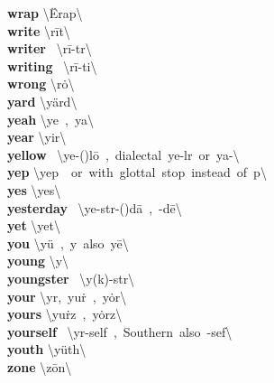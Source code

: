 \documentclass[10pt,a4paper]{article}
\begin{document}
\begin{multicols}{2}
\textbf{ wrap }\quad \textbackslash \"{E}\textsuperscript{\pwedge}rap\textbackslash \\
\textbf{ write }\quad \textbackslash \textprimstress r\={i}t\textbackslash \\
\textbf{ writer }\quad \ \textbackslash \textprimstress r\={i}-t\textschwa r\textbackslash \\
\textbf{ writing }\quad \ \textbackslash \textprimstress r\={i}-ti\engma \textbackslash \\
\textbf{ wrong }\quad \textbackslash \textprimstress r\.{o}\engma \textbackslash \\
\textbf{ yard }\quad \textbackslash \textprimstress y\"{a}rd\textbackslash \\
\textbf{ yeah }\quad \textbackslash \textprimstress ye\textschwa \ ,\ \textprimstress ya\textschwa \textbackslash \\
\textbf{ year }\quad \textbackslash \textprimstress yir\textbackslash \\
\textbf{ yellow }\quad \ \textbackslash \textprimstress ye-(\textsecstress )l\={o}\ ,\ dialectal\ \textprimstress ye-l\textschwa r\ or\ \textprimstress ya-\textbackslash \\
\textbf{ yep }\quad \textbackslash \textprimstress yep\ \ or\ with\ glottal\ stop\ instead\ of\ p\textbackslash \\
\textbf{ yes }\quad \textbackslash \textprimstress yes\textbackslash \\
\textbf{ yesterday }\quad \ \textbackslash \textprimstress ye-st\textschwa r-(\textsecstress )d\={a}\ ,\ -d\={e}\textbackslash \\
\textbf{ yet }\quad \textbackslash \textprimstress yet\textbackslash \\
\textbf{ you }\quad \textbackslash \textprimstress y\"{u}\ ,\ y\textschwa \ also\ y\={e}\textbackslash \\
\textbf{ young }\quad \textbackslash \textprimstress y\textschwa \engma \textbackslash \\
\textbf{ youngster }\quad \ \textbackslash \textprimstress y\textschwa \engma (k)-st\textschwa r\textbackslash \\
\textbf{ your }\quad \textbackslash y\textschwa r,\ \textprimstress yu\. r\ ,\ \textprimstress y\.{o}r\textbackslash \\
\textbf{ yours }\quad \textbackslash \textprimstress yu\. rz\ ,\ \textprimstress y\.{o}rz\textbackslash \\
\textbf{ yourself }\quad \ \textbackslash y\textschwa r-\textprimstress self\ ,\ Southern\ also\ -\textprimstress sef\textbackslash \\
\textbf{ youth }\quad \textbackslash \textprimstress y\"{u}th\textbackslash \\
\textbf{ zone }\quad \textbackslash \textprimstress z\={o}n\textbackslash \\
\end{multicols}
\end{document}
